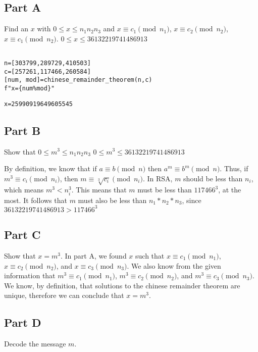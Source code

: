 \documentclass[11pt]{article}
\begin{document}
\subsection{Part A}
\label{sec:orgcac06d7}
Find an \(x\) with \(0\le x\le n_{1}n_{2}n_{3}\) and \(x\equiv c_{1}\pmod{n_1}\), \(x\equiv c_{2}\pmod{n_2}\), \(x\equiv c_{1}\pmod{n_2}\).
\(0\le x\le 36132219741486913\)

\begin{verbatim}

n=[303799,289729,410503]
c=[257261,117466,260584]
[num, mod]=chinese_remainder_theorem(n,c)
f"x={num%mod}"

\end{verbatim}

\begin{verbatim}
x=25990919649605545
\end{verbatim}

\subsection{Part B}
\label{sec:org82b75a1}
Show that \(0\le m^{3}\le n_1n_2n_3\)
\(0\le m^3\le 36132219741486913\)

By definition, we know that if \(a\equiv b\pmod{n}\) then \(a^m\equiv b^m\pmod{n}\).
Thus, if \(m^3\equiv c_i\pmod{n_i}\), then \(m\equiv \sqrt[3]{c_i}\pmod{n_i}\).
In RSA, \(m\) should be less than \(n_i\), which means \(m^3< n_i^3\).
This means that \(m\) must be less than \(117466^3\), at the most.
It follows that \(m\) must also be less than \(n_1*n_2*n_3\), since \(36132219741486913>117466^3\)

\subsection{Part C}
\label{sec:orged220af}
Show that \(x=m^3\).
In part A, we found \(x\) such that \(x\equiv c_1\pmod{n_1}\), \(x\equiv c_2\pmod{n_2}\), and \(x\equiv c_3\pmod{n_3}\).
We also know from the given information that \(m^3\equiv c_1\pmod{n_1}\), \(m^3\equiv c_2\pmod{n_2}\), and \(m^3\equiv c_3\pmod{n_3}\).
We know, by definition, that solutions to the chinese remainder theorem are unique, therefore we can conclude that \(x=m^3\).

\subsection{Part D}
\label{sec:org3a0fd3f}
Decode the message \(m\).
\end{document}
